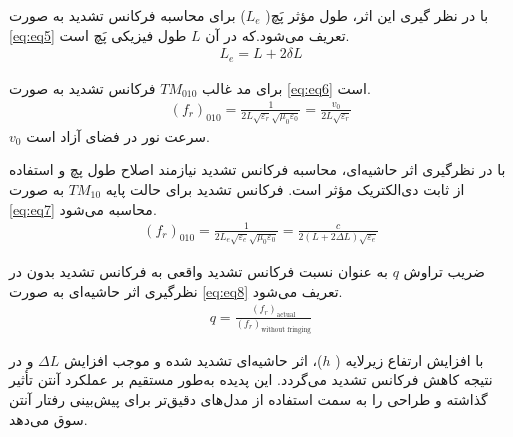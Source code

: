 با در نظر گیری این اثر، طول مؤثر پَچ(
$L_{e}$)
برای محاسبه فرکانس تشدید به صورت 
\eqref{eq:eq5}
 تعریف می‌شود.که در آن 
 $L$
  طول فیزیکی پَچ است.
\begin{align}
	\label{eq:eq5}
	L_{e} = L + 2\delta L
\end{align}

برای مد غالب
$TM_{010}$
فرکانس تشدید به صورت 
\eqref{eq:eq6}
است.
\begin{align}
	\label{eq:eq6}
	(f_r)_{010} = \frac{1}{2L\sqrt{\varepsilon_r}\sqrt{\mu_0\varepsilon_0}} = \frac{v_0}{2L\sqrt{\varepsilon_r}}
\end{align}
$v_0$
سرعت نور در فضای آزاد است.

با در نظرگیری اثر حاشیه‌ای، محاسبه فرکانس تشدید نیازمند اصلاح طول پچ و استفاده از ثابت دی‌الکتریک مؤثر است. فرکانس تشدید برای حالت پایه
$TM_{10}$
 به صورت
\eqref{eq:eq7}
  محاسبه می‌شود.
\begin{align}
	\label{eq:eq7}
	(f_r)_{010} = \frac{1}{2L_{e}\sqrt{\varepsilon_{e}}\sqrt{\mu_0\varepsilon_0}} = \frac{c}{2(L+2\Delta L)\sqrt{\varepsilon_{e}}}
\end{align}

ضریب تراوش
$q$
 به عنوان نسبت فرکانس تشدید واقعی به فرکانس تشدید بدون در نظرگیری اثر حاشیه‌ای به صورت
\eqref{eq:eq8}
  تعریف می‌شود.
\begin{align}
	\label{eq:eq7}
	q = \frac{(f_r)_{\text{actual}}}{(f_r)_{\text{without fringing}}}
\end{align}

با افزایش ارتفاع زیرلایه (
$h$)،
 اثر حاشیه‌ای تشدید شده و موجب افزایش
 $\Delta L$
  و در نتیجه کاهش فرکانس تشدید می‌گردد. این پدیده به‌طور مستقیم بر عملکرد آنتن تأثیر گذاشته و طراحی را به سمت استفاده از مدل‌های دقیق‌تر برای پیش‌بینی رفتار آنتن سوق می‌دهد.











